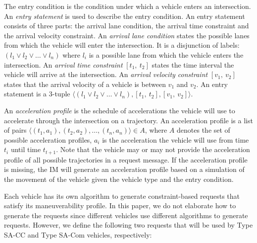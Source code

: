 The entry condition is the condition under which a vehicle enters an
intersection.  An \emph{entry statement} is used to describe the entry
condition. An entry statement consists of three parts: the arrival
lane condition, the arrival time constraint and the arrival velocity
constraint.  An \emph{arrival lane condition} states the possible lanes
from which the vehicle will enter the intersection.  It is a disjunction of
labels: $(l_1 \vee l_2 \vee \ldots \vee l_n)$ where $l_i$ is a
possible lane from which the vehicle enters the intersection.  An
\emph{arrival time constraint} $[t_1,\ t_2]$ states the time interval
the vehicle will arrive at the intersection.  An \emph{arrival
velocity constraint} $[v_1,\ v_2]$ states that the arrival velocity of
a vehicle is between $v_1$ and $v_2$.  An entry statement is a
$3$-tuple $\langle (l_1 \vee l_2 \vee \ldots \vee l_n), [t_1,\ t_2],
[v_1,\ v_2] \rangle$.

An \emph{acceleration profile} is the schedule of accelerations the
vehicle will use to accelerate through the intersection on a
trajectory. An acceleration profile is a list of pairs $\langle (t_1,
a_1), (t_2, a_2), \ldots, (t_n, a_n) \rangle \in A$, where $A$ denotes
the set of possible acceleration profiles, $a_i$ is the acceleration
the vehicle will use from time $t_i$ until time $t_{t+1}$.  Note that
the vehicle may or may not provide the acceleration profile of all
possible trajectories in a request message.  If the acceleration
profile is missing, the IM will generate an acceleration profile based
on a simulation of the movement of the vehicle given the vehicle type
and the entry condition.


Each vehicle has its own algorithm to generate constraint-based
requests that satisfy its maneuverability profile. In this paper, we
do not elaborate how to generate the requests since different vehicles
use different algorithms to generate requests.  However, we define the
following two requests that will be used by Type SA-CC and Type SA-Com
vehicles, respectively:

